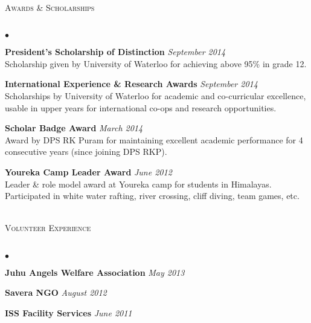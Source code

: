\documentclass{article}
\newcommand{\lineunder}{\vspace*{-8pt} \\ \hspace*{-18pt} \hrulefill \\}
\newcommand{\header}[1]{{\hspace*{-15pt}\vspace*{6pt} \textsc{#1}} \vspace*{-6pt} \lineunder}
\newenvironment{achievements}{\begin{list}{$\bullet$}{\topsep 0pt \itemsep -1.5pt \leftmargin 5pt}}{\vspace*{4pt}\end{list}}
\begin{document}
\vspace{7pt}

\header{\normalsize Awards \& Scholarships}
\begin{achievements}
\item \textbf{President's Scholarship of Distinction} \hfill \textit {September 2014}
\\ Scholarship given by University of Waterloo for achieving above 95\% in grade 12.
\item \textbf{International Experience \& Research Awards} \hfill \textit {September 2014}
\\ Scholarships by University of Waterloo for academic and co-curricular excellence, usable in upper years for international co-ops and research opportunities.
\item \textbf{Scholar Badge Award} \hfill \textit {March 2014}
\\ Award by DPS RK Puram for maintaining excellent academic performance for 4 consecutive years (since joining DPS RKP).
\item \textbf{Youreka Camp Leader Award} \hfill \textit {June 2012}
\\ Leader \& role model award at Youreka camp for students in Himalayas. Participated in white water rafting, river crossing, cliff diving, team games, etc. \\ \hspace*{-18pt}  \\
\end{achievements}

\header{\normalsize Volunteer Experience}
\begin{achievements}
\item \textbf{Juhu Angels Welfare Association}   \hfill \textit{May 2013}
\item \textbf{Savera NGO}     \hfill \textit{August 2012}
\item \textbf{ISS Facility Services}    \hfill \textit{June 2011}
\end{achievements}
\end{document}
